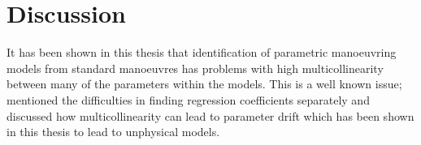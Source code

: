 \chapter{Discussion\label{ch:discussion}}
It has been shown in this thesis that identification of parametric manoeuvring models from standard manoeuvres has problems with high multicollinearity between many of the parameters within the models.
This is a well known issue; \textcite{yoonIdentificationHydrodynamicCoefficients2003} mentioned the difficulties in finding regression coefficients separately and \textcite{wangQuantifyingMulticollinearityShip2018} discussed how multicollinearity can lead to parameter drift which has been shown in this thesis to lead to unphysical models.

